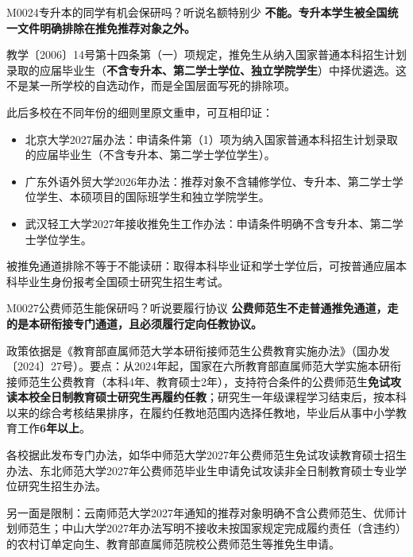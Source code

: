 \begin{qa}{M0024}{专升本的同学有机会保研吗？听说名额特别少}
\textbf{不能。专升本学生被全国统一文件明确排除在推免推荐对象之外。}

教学〔2006〕14号第十四条第（一）项规定，推免生从纳入国家普通本科招生计划录取的应届毕业生（\textbf{不含专升本、第二学士学位、独立学院学生}）中择优遴选。这不是某一所学校的自选动作，而是全国层面写死的排除项。

此后多校在不同年份的细则里原文重申，可互相印证：

\begin{itemize}
  \item 北京大学2027届办法：申请条件第（1）项为纳入国家普通本科招生计划录取的应届毕业生（不含专升本、第二学士学位学生）。
  \item 广东外语外贸大学2026年办法：推荐对象不含辅修学位、专升本、第二学士学位学生、本硕项目的国际班学生和独立学院学生。
  \item 武汉轻工大学2027年接收推免生工作办法：申请条件明确不含专升本、第二学士学位学生。
\end{itemize}

被推免通道排除不等于不能读研：取得本科毕业证和学士学位后，可按普通应届本科毕业生身份报考全国硕士研究生招生考试。
\end{qa}

\begin{qa}{M0027}{公费师范生能保研吗？听说要履行协议}
\textbf{公费师范生不走普通推免通道，走的是本研衔接专门通道，且必须履行定向任教协议。}

政策依据是《教育部直属师范大学本研衔接师范生公费教育实施办法》（国办发〔2024〕27号）。要点：从2024年起，国家在六所教育部直属师范大学实施本研衔接师范生公费教育（本科4年、教育硕士2年），支持符合条件的公费师范生\textbf{免试攻读本校全日制教育硕士研究生再履约任教}；研究生一年级课程学习结束后，按本科以来的综合考核结果排序，在履约任教地范围内选择任教地，毕业后从事中小学教育工作\textbf{6年以上}。

各校据此发布专门办法，如华中师范大学2027年公费师范生免试攻读教育硕士招生办法、东北师范大学2027年公费师范毕业生申请免试攻读非全日制教育硕士专业学位研究生招生办法。

另一面是限制：云南师范大学2027年通知的推荐对象明确不含公费师范生、优师计划师范生；中山大学2027年办法写明不接收未按国家规定完成履约责任（含违约）的农村订单定向生、教育部直属师范院校公费师范生等推免生申请。
\end{qa}

